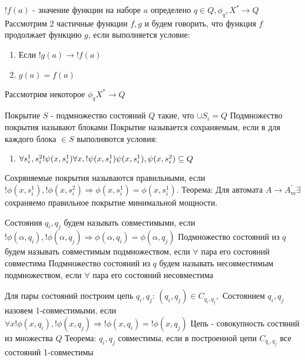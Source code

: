 \documentclass[a5paper,10pt]{article}
\begin{document}
				$ !f(a) $ - значение функции на наборе $a$ определено
				$q \in Q, \phi_q, X^{*} \rightarrow Q$
				Рассмотрим 2 частичные функции $f,g$ и будем говорить, что функция $f$ продолжает функцию $g$, если выполняется условие:
				\begin{enumerate}
					\item Если $ !g(a) \rightarrow !f(a) $
					\item $ g(a) = f(a) $
				\end{enumerate}
				Рассмотрим некоторое $ \phi_q X^{*} \rightarrow Q $

				Покрытие $S$ - подмножество состояний $Q$ такие, что $\cup S_i = Q$
				Подмножество покрытия называют блоками 
				Покрытие называется сохраняемым, если в для каждого блока $\in S$ выполняются условия:
				\begin{enumerate}
					\item $ \forall s_i^1, s_i^2 !\psi(x,s_i^1) \forall x, \\
					 !\psi(x,s_i^1) \psi(x,s_i^1),\psi(x,s_i^2) \subseteq Q $
				\end{enumerate}
				Сохряняемые покрытия называются правильными, если $!\phi(x,s_i^1), !\phi(x,s_i^2) \Rightarrow \phi(x,s_i^1)=\phi(x,s_i^1)$.
				Теорема: Для автомата $ A \rightarrow A^\prime_m \exists $ сохраняемо правильное покрытие минимальной мощности.

				Состояния $q_i,q_j$ будем называть совместимыми, если $!\phi(\alpha,q_i),!\phi(\alpha,q_j) \Rightarrow \phi(\alpha,q_i)=\phi(\alpha,q_j)$
				Подмножество состояний из $q$ будем называть совместимым подмножеством, если $\forall$ пара его состояний совместима
				Подмножество состояний из $q$ будем называть несовместимым подмножеством, если $\forall$ пара его состояний несовместима

				Для пары состояний построим цепь $q_i,q_j$:
				$(q_i,q_j) \in C_{q_i,q_j},$
				Состоянием $q_i,q_j$ назовем 1-совместимыми, если $\forall x !\phi(x,q_i), !\phi(x,q_j) \Rightarrow !\phi(x,q_i)=!\phi(x,q_j)$
				Цепь - совокупность состяний из множества $Q$
				Теорема: $q_i,q_j$ совместимы, если в построенной цепи $C_{q_i,q_j}$ все состояний 1-совместимы
\end{document}
